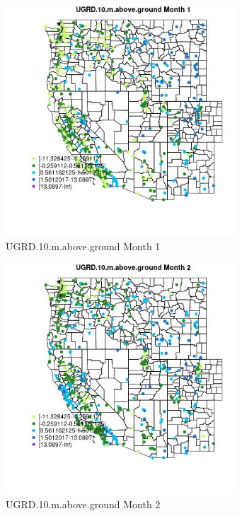 \begin{figure} 
\centering  
\includegraphics[width=0.77\textwidth]{Code_Outputs/Report_ML_input_PM25_Step4_part_e_de_duplicated_aves_compiled_2019-05-14wNAs_MapObsMo1UGRD10maboveground.jpg} 
\caption{\label{fig:Report_ML_input_PM25_Step4_part_e_de_duplicated_aves_compiled_2019-05-14wNAsMapObsMo1UGRD10maboveground}UGRD.10.m.above.ground Month 1} 
\end{figure} 
 

\begin{figure} 
\centering  
\includegraphics[width=0.77\textwidth]{Code_Outputs/Report_ML_input_PM25_Step4_part_e_de_duplicated_aves_compiled_2019-05-14wNAs_MapObsMo2UGRD10maboveground.jpg} 
\caption{\label{fig:Report_ML_input_PM25_Step4_part_e_de_duplicated_aves_compiled_2019-05-14wNAsMapObsMo2UGRD10maboveground}UGRD.10.m.above.ground Month 2} 
\end{figure} 
 

